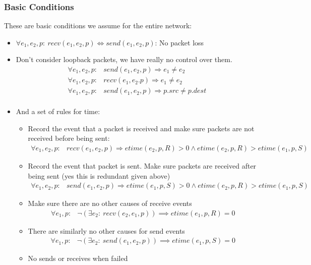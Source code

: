 \subsubsection{Basic Conditions}
These are basic conditions we assume for the entire network:
\begin{itemize}
\item $\forall e_1, e_2, p:\ recv(e_1, e_2, p) \iff send(e_1, e_2, p)$: No packet loss
\item Don't consider loopback packets, we have really no control over them.
\begin{align*}
\forall e_1, e_2, p:& send(e_1, e_2, p) \Rightarrow e_1 \neq e_2\\
\forall e_1, e_2, p:& recv(e_1, e_2. p) \Rightarrow e_1 \neq e_2\\
\forall e_1, e_2, p:& send(e_1, e_2, p) \Rightarrow p.src \neq p.dest\\
\end{align*}
\item And a set of rules for time:
\begin{itemize}
\item Record the event that a packet is received and make sure packets are not received before being sent:
\begin{align*}
    \forall e_1, e_2, p:& recv(e_1, e_2, p)\Rightarrow etime(e_2, p, R) > 0 \land etime(e_2, p, R) > etime(e_1, p, S)
\end{align*}
\item Record the event that packet is sent. Make sure packets are received after being sent (yes this is redundant given above)
\begin{align*}
    \forall e_1, e_2, p:& send(e_1, e_2, p)\Rightarrow etime(e_1, p, S) > 0 \land etime(e_2, p, R) > etime(e_1, p, S)
\end{align*}
\item Make sure there are no other causes of receive events
\begin{align*}
    \forall e_1, p:& \neg(\exists e_2:\ recv(e_2, e_1, p)) \implies etime(e_1, p, R) = 0
\end{align*}
\item There are similarly no other causes for send events
\begin{align*}
    \forall e_1, p:& \neg(\exists e_2:\ send(e_1, e_2, p)) \implies etime(e_1, p, S) = 0
\end{align*}
\item No sends or receives when failed
\end{itemize}
\end{itemize}


